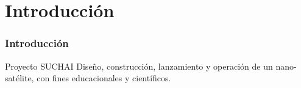 \documentclass[xcolor=dvipsnames]{beamer}
\begin{document}
	\section{Introducción}
	\begin{frame}
		\frametitle{Introducción}
		
		\begin{block}{Proyecto SUCHAI}
		Diseño, construcción,  lanzamiento y operación de un nano-satélite, con fines educacionales y científicos.\\
		\vspace{0.3cm}
		\end{block}
		
		\begin{figure}[b]\centering
            \hspace{2cm}

\end{figure}
\end{frame}
\end{document}
